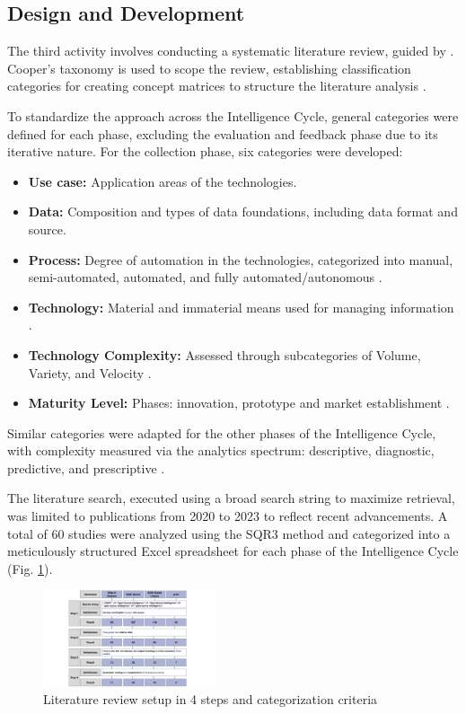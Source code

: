 \documentclass[10pt]{article}
\begin{document}
\subsection{Design and Development}
The third activity involves conducting a systematic literature review, guided by \cite{Cleven.2009}. Cooper's taxonomy \cite{Cooper.1988} is used to scope the review, establishing classification categories for creating concept matrices to structure the literature analysis \cite{Webster.2002}.

To standardize the approach across the Intelligence Cycle, general categories were defined for each phase, excluding the evaluation and feedback phase due to its iterative nature. For the collection phase, six categories were developed:
\begin{itemize}
    \item \textbf{Use case:} Application areas of the technologies.
    \item \textbf{Data:} Composition and types of data foundations, including data format and source.
    \item \textbf{Process:} Degree of automation in the technologies, categorized into manual, semi-automated, automated, and fully automated/autonomous \cite{Duncheon.2002, Billings.1997, Endsley.1999}.
    \item \textbf{Technology:} Material and immaterial means used for managing information \cite{Bleck.2004}.
    \item \textbf{Technology Complexity:} Assessed through subcategories of Volume, Variety, and Velocity \cite{Elgendy.2014, Singh.2012}.
    \item \textbf{Maturity Level:} Phases: innovation, prototype and  market establishment \cite{Stich.2022}.
\end{itemize}

Similar categories were adapted for the other phases of the Intelligence Cycle, with complexity measured via the analytics spectrum: descriptive, diagnostic, predictive, and prescriptive \cite{Delen.2013}.

The literature search, executed using a broad search string to maximize retrieval, was limited to publications from 2020 to 2023 to reflect recent advancements. A total of 60 studies were analyzed using the SQR3 method \cite{Robinson.1970} and categorized into a meticulously structured Excel spreadsheet for each phase of the Intelligence Cycle (Fig. \ref{fig:LiteratureReview}).

\begin{figure}[t]
    \centering
    \includegraphics[width=0.45\textwidth]{PDF/images/crop_Kategorisierungskriterien und Literraturreviewaufbau}
    \caption{Literature review setup in 4 steps and categorization criteria}
    \label{fig:LiteratureReview}
\end{figure}
\end{document}
